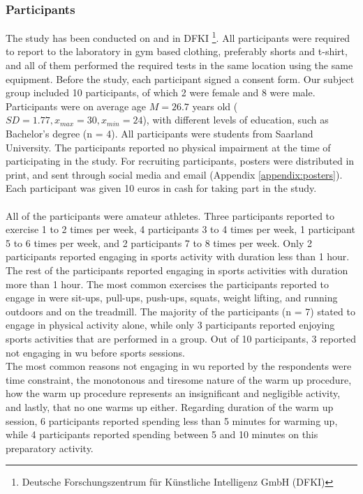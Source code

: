 \subsubsection{Participants}
The study has been conducted on  and  in DFKI \footnote{Deutsche Forschungszentrum für Künstliche Intelligenz GmbH (DFKI) }. All participants were required to report to the laboratory in gym based clothing, preferably shorts and t-shirt, and all of them performed the required tests in the same location using the same equipment. Before the study, each participant signed a consent form. Our subject group included 10 participants, of which 2 were female and 8 were male. Participants were on average age \begin{math}M = 26.7\end{math} years old (\begin{math}SD= 1.77,  x_{max}=30 ,x_{min}= 24 \end{math}), with different levels of education, such as Bachelor's degree (n = 4). All participants were students from Saarland University. The participants reported no physical impairment at the time of participating in the study. For recruiting participants, posters were distributed in print, and sent through social media and email (Appendix \ref{appendix:posters}). Each participant was given 10 euros in cash for taking part in the study.\\\\ All of the participants were amateur athletes. Three participants reported to exercise 1 to 2 times per week, 4 participants 3 to 4 times per week, 1 participant 5 to 6 times per week, and 2 participants 7 to 8 times per week. Only 2 participants reported engaging in sports activity with duration less than 1 hour. The rest of the participants reported engaging in sports activities with duration more than 1 hour. The most common exercises the participants reported to engage in were sit-ups, pull-ups, push-ups, squats, weight lifting, and running outdoors and on the treadmill. The majority of the participants (n = 7) stated to engage in physical activity alone, while only 3 participants reported enjoying sports activities that are performed in a group. Out of 10 participants, 3 reported not engaging in  \acrshort{wu} before sports sessions. \\The most common reasons not engaging in \acrshort{wu} reported by the respondents were time constraint, the monotonous and tiresome nature of the warm up procedure, how the warm up procedure represents an insignificant and negligible activity, and lastly, that no one warms up either. Regarding duration of the warm up session, 6 participants reported spending less than 5 minutes for warming up, while 4 participants reported spending between 5 and 10 minutes on this preparatory activity.\\
